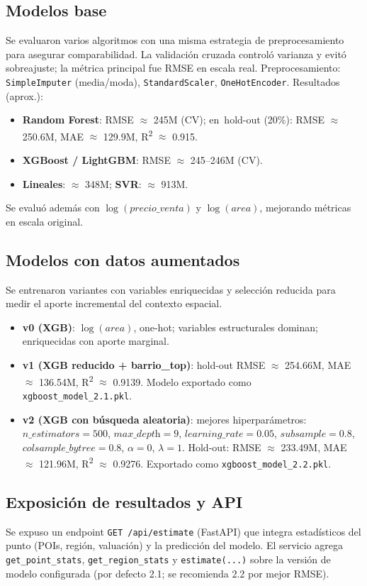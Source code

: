 \subsection*{Modelos base}
Se evaluaron varios algoritmos con una misma estrategia de preprocesamiento para asegurar comparabilidad. La validación cruzada controló varianza y evitó sobreajuste; la métrica principal fue RMSE en escala real.
Preprocesamiento: \texttt{SimpleImputer} (media/moda), \texttt{StandardScaler}, \texttt{OneHotEncoder}. Resultados (aprox.):
\begin{itemize}
    \item \textbf{Random Forest}: RMSE \(\approx\) 245M (CV); en\ hold-out (20\%): RMSE \(\approx\) 250.6M, MAE \(\approx\) 129.9M, R\textsuperscript{2} \(\approx\) 0.915.
    \item \textbf{XGBoost / LightGBM}: RMSE \(\approx\) 245--246M (CV).
    \item \textbf{Lineales}: \(\approx\) 348M; \textbf{SVR}: \(\approx\) 913M.
\end{itemize}
Se evaluó además con \(\log(\textit{precio\_venta})\) y \(\log(\textit{area})\), mejorando métricas en escala original.

\subsection*{Modelos con datos aumentados}
Se entrenaron variantes con variables enriquecidas y selección reducida para medir el aporte incremental del contexto espacial.
\begin{itemize}
    \item \textbf{v0 (XGB)}: \(\log(\textit{area})\), one-hot; variables estructurales dominan; enriquecidas con aporte marginal.
    \item \textbf{v1 (XGB reducido + barrio\_top)}: hold-out RMSE \(\approx\) 254.66M, MAE \(\approx\) 136.54M, R\textsuperscript{2} \(\approx\) 0.9139. Modelo exportado como \texttt{xgboost\_model\_2.1.pkl}.
    \item \textbf{v2 (XGB con búsqueda aleatoria)}: mejores hiperparámetros: \(n\_\textit{estimators}=500\), \(\textit{max\_depth}=9\), \(\textit{learning\_rate}=0.05\), \(\textit{subsample}=0.8\), \(\textit{colsample\_bytree}=0.8\), \(\alpha=0\), \(\lambda=1\). Hold-out: RMSE \(\approx\) 233.49M, MAE \(\approx\) 121.96M, R\textsuperscript{2} \(\approx\) 0.9276. Exportado como \texttt{xgboost\_model\_2.2.pkl}.
\end{itemize}

\subsection*{Exposición de resultados y API}
Se expuso un endpoint \texttt{GET /api/estimate} (FastAPI) que integra estadísticos del punto (POIs, región, valuación) y la predicción del modelo. El servicio agrega \texttt{get\_point\_stats}, \texttt{get\_region\_stats} y \texttt{estimate(...)} sobre la versión de modelo configurada (por defecto 2.1; se recomienda 2.2 por mejor RMSE).

